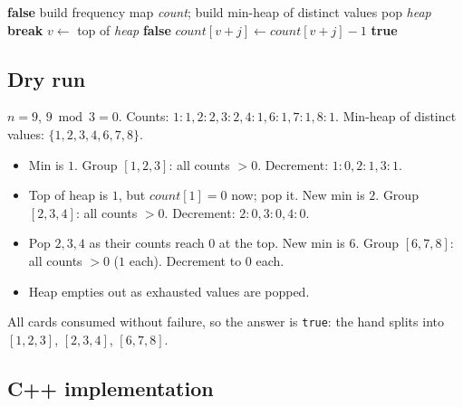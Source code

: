 \begin{algorithm}[H]
\caption{Hand of Straights}
\begin{algorithmic}[1]
   \Return \textbf{false} \EndIf
  \State build frequency map \textit{count}; build min-heap of distinct values
      \State pop \textit{heap}
    \EndWhile
     \textbf{break} \EndIf
    \State $v \gets$ top of \textit{heap}
       \Return \textbf{false} \EndIf
      \State $\textit{count}[v+j] \gets \textit{count}[v+j] - 1$
    \EndFor
  \EndWhile
  \State \Return \textbf{true}
\EndProcedure
\end{algorithmic}
\end{algorithm}

\subsection*{Dry run}


$n=9$, $9 \bmod 3 = 0$. Counts: $1{:}1, 2{:}2, 3{:}2, 4{:}1, 6{:}1, 7{:}1,
8{:}1$. Min-heap of distinct values: $\{1,2,3,4,6,7,8\}$.

\begin{itemize}
  \item Min is $1$. Group $[1,2,3]$: all counts $>0$. Decrement:
        $1{:}0, 2{:}1, 3{:}1$.
  \item Top of heap is $1$, but $\textit{count}[1]=0$ now; pop it. New
        min is $2$. Group $[2,3,4]$: all counts $>0$. Decrement:
        $2{:}0, 3{:}0, 4{:}0$.
  \item Pop $2,3,4$ as their counts reach $0$ at the top. New min is $6$.
        Group $[6,7,8]$: all counts $>0$ ($1$ each). Decrement to $0$
        each.
  \item Heap empties out as exhausted values are popped.
\end{itemize}

All cards consumed without failure, so the answer is \texttt{true}: the
hand splits into $[1,2,3]$, $[2,3,4]$, $[6,7,8]$.

\subsection*{C++ implementation}

